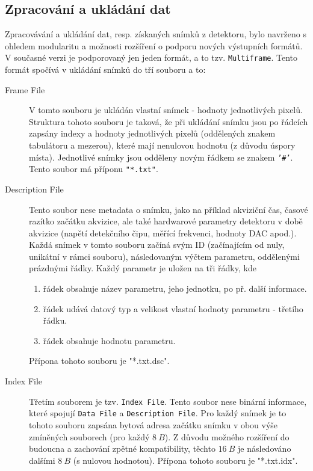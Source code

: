 \subsection{Zpracování a ukládání dat}\label{atlas:cont:output}
Zpracovávání a ukládání dat, resp. získaných snímků z detektoru, bylo navrženo s ohledem modularitu a možnosti rozšíření o podporu nových výstupních formátů. V současné verzi je podporovaný jen jeden formát, a to tzv. \texttt{Multiframe}. Tento formát spočívá v ukládání snímků do tří souboru a to:
\begin{description}
	\item[Frame File] V tomto souboru je ukládán vlastní snímek - hodnoty jednotlivých pixelů. Struktura tohoto souboru je taková, že při ukládání snímku jsou po řádcích zapsány indexy a hodnoty jednotlivých pixelů (oddělených znakem tabulátoru a mezerou), které mají nenulovou hodnotu (z důvodu úspory místa). Jednotlivé snímky jsou odděleny novým řádkem se znakem \texttt{'\#'}. Tento soubor má příponu \texttt{"*.txt"}.
	\item[Description File] Tento soubor nese metadata o snímku, jako na příklad akviziční čas, časové razítko začátku akvizice, ale také hardwarové parametry detektoru v době akvizice (napětí detekčního čipu, měřící frekvenci, hodnoty DAC apod.). Každá snímek v tomto souboru začíná svým ID (začínajícím od nuly, unikátní v rámci souboru), následovaným výčtem parametru, oddělenými prázdnými řádky. Každý parametr je uložen na tři řádky, kde
		\begin{enumerate}
			\item řádek obsahuje název parametru, jeho jednotku, po př. další informace.
			\item řádek udává datový typ a velikost vlastní hodnoty parametru - třetího řádku.
			\item řádek obsahuje hodnotu parametru.
		\end{enumerate}
	Přípona tohoto souboru je "*.txt.dsc".
	\item[Index File] Třetím souborem je tzv. \texttt{Index File}. Tento soubor nese binární informace, které spojují \texttt{Data File} a \texttt{Description File}. Pro každý snímek je to tohoto souboru zapsána bytová adresa začátku snímku v obou výše zmíněných souborech (pro každý $8~B$). Z důvodu možného rozšíření do budoucna a zachování zpětné kompatibility, těchto $16~B$ je následováno dalšími $8~B$ (s nulovou hodnotou). Přípona tohoto souboru je "*.txt.idx".
\end{description}

